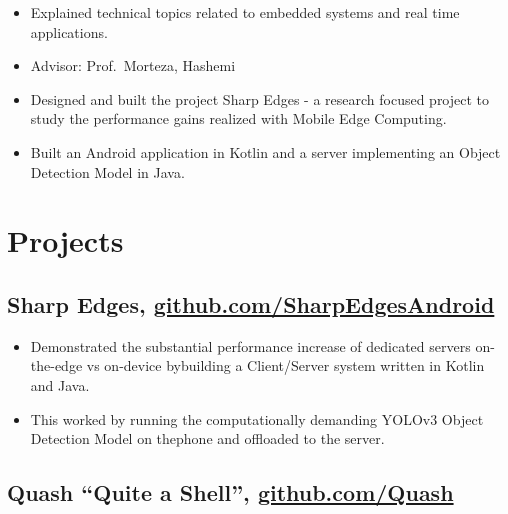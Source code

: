 \documentclass{mycv}
\begin{document}
\begin{itemize}
    \item Explained technical topics related to embedded systems and real time applications.
\end{itemize}
 
\vspace{+\parskip}%

\begin{positions}
\end{positions}

\vspace{-\parskip}%
\begin{itemize}[label={}]
    \item Advisor: {Prof.~Morteza, Hashemi}
\end{itemize}

\begin{itemize}
  \item Designed and built the project Sharp Edges - a research focused project to study the performance gains realized with Mobile Edge Computing.
  \item Built an Android application in Kotlin and a server implementing an Object Detection Model in Java.
\end{itemize}

\vspace{-\parskip}%

\section{Projects}

\subsection{Sharp Edges\normalfont, \href{http://github.com/erjseals/SharpEdgesAndroid}{github.com/SharpEdgesAndroid}}

\begin{itemize}
    \item Demonstrated the substantial performance increase of dedicated servers on-the-edge vs on-device bybuilding a Client/Server system written in Kotlin and Java.
    \item This worked by running the computationally demanding YOLOv3 Object Detection Model on thephone and offloaded to the server.
\end{itemize}

\subsection{Quash “Quite a Shell”\normalfont, \href{http://github.com/erjseals/Quash}{github.com/Quash}}
\end{document}
